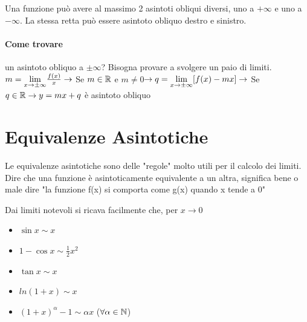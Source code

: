 \documentclass[12pt, a4paper, openany]{book}
\begin{document}
Una funzione può avere al massimo 2 asintoti obliqui diversi, uno a $+\infty$ e uno a $-\infty$.
La stessa retta può essere asintoto obliquo destro e sinistro.
\paragraph*{Come trovare} un asintoto obliquo a $\pm \infty$? %
Bisogna provare a svolgere un paio di limiti.
\\$m= \underset{x \to \pm \infty}{\lim} \frac{f(x)}{x} \rightarrow$ Se $m\in\mathbb{R}$ e $m\neq 0$$ \rightarrow q=\underset{x \to \pm \infty}{\lim} [f(x)-mx] \rightarrow$ Se $q\in\mathbb{R} \rightarrow y=mx+q$ è asintoto obliquo

	\section{Equivalenze Asintotiche}
	Le equivalenze asintotiche sono delle "regole" molto utili per il calcolo dei limiti.
	Dire che una funzione è asintoticamente equivalente a un altra, significa bene o male dire "la funzione f(x) si comporta come g(x) quando x tende a 0"

	Dai limiti notevoli si ricava facilmente che, per $x \to 0$
	\begin{itemize}
		\item $\sin x \sim x$
		\item $1 - \cos x \sim \frac{1}{2}x^2$
		\item $\tan x \sim x$
		\item $ln(1+x) \sim x$
		\item $(1+x)^\alpha -1 \sim \alpha x$ ($\forall \alpha \in \mathbb{N}$)
	\end{itemize}
\end{document}
